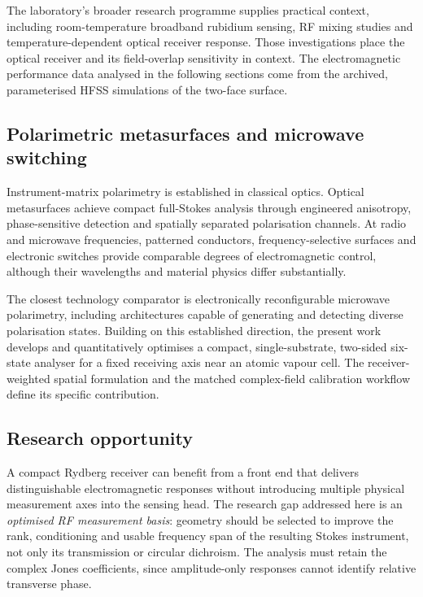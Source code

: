 \documentclass{ieeeaccess}
\begin{document}
The laboratory's broader research programme supplies practical context, including room-temperature broadband rubidium sensing, RF mixing studies and temperature-dependent optical receiver response\cite{Somaweera2025Review}. Those investigations place the optical receiver and its field-overlap sensitivity in context. The electromagnetic performance data analysed in the following sections come from the archived, parameterised HFSS simulations of the two-face surface.

\subsection{Polarimetric metasurfaces and microwave switching}
Instrument-matrix polarimetry is established in classical optics\cite{Azzam1988,Azzam1990,Tyo2002}. Optical metasurfaces achieve compact full-Stokes analysis through engineered anisotropy, phase-sensitive detection and spatially separated polarisation channels\cite{Arbabi2018,Basiri2019,Rubin2019,Lin2019,Ren2022,Zuo2023}. At radio and microwave frequencies, patterned conductors, frequency-selective surfaces and electronic switches provide comparable degrees of electromagnetic control, although their wavelengths and material physics differ substantially\cite{Holloway2012MS,Yu2014,Glybovski2016,Cui2014,Silaghi2021,Sofi2021,Afzal2024,Pfeiffer2013,Achouri2015}.

The closest technology comparator is electronically reconfigurable microwave polarimetry, including architectures capable of generating and detecting diverse polarisation states\cite{Chen2025Reconfigurable}. Building on this established direction, the present work develops and quantitatively optimises a compact, single-substrate, two-sided six-state analyser for a fixed receiving axis near an atomic vapour cell. The receiver-weighted spatial formulation and the matched complex-field calibration workflow define its specific contribution.

\subsection{Research opportunity}
A compact Rydberg receiver can benefit from a front end that delivers distinguishable electromagnetic responses without introducing multiple physical measurement axes into the sensing head. The research gap addressed here is an \emph{optimised RF measurement basis}: geometry should be selected to improve the rank, conditioning and usable frequency span of the resulting Stokes instrument, not only its transmission or circular dichroism. The analysis must retain the complex Jones coefficients, since amplitude-only responses cannot identify relative transverse phase.
\end{document}
